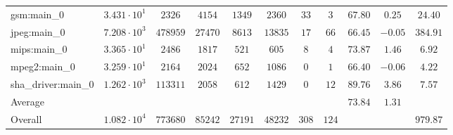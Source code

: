 \begin{tabular}{|l|c|c|c|c|c|c|c|c|c|c|}
gsm:main\_0             & $ 3.431 \cdot 10^{1} $ & $ 2326   $ & $ 4154  $ & $ 1349  $ & $ 2360  $ & $ 33  $ & $ 3   $ & $ 67.80       $ & $ 0.25    $ & $ 24.40   $ \\
jpeg:main\_0            & $ 7.208 \cdot 10^{3} $ & $ 478959 $ & $ 27470 $ & $ 8613  $ & $ 13835 $ & $ 17  $ & $ 66  $ & $ 66.45       $ & $ -0.05   $ & $ 384.91  $ \\
mips:main\_0            & $ 3.365 \cdot 10^{1} $ & $ 2486   $ & $ 1817  $ & $ 521   $ & $ 605   $ & $ 8   $ & $ 4   $ & $ 73.87       $ & $ 1.46    $ & $ 6.92    $ \\
mpeg2:main\_0           & $ 3.259 \cdot 10^{1} $ & $ 2164   $ & $ 2024  $ & $ 652   $ & $ 1086  $ & $ 0   $ & $ 1   $ & $ 66.40       $ & $ -0.06   $ & $ 4.22    $ \\
sha\_driver:main\_0     & $ 1.262 \cdot 10^{3} $ & $ 113311 $ & $ 2058  $ & $ 612   $ & $ 1429  $ & $ 0   $ & $ 12  $ & $ 89.76       $ & $ 3.86    $ & $ 7.57    $ \\
\hline
Average                 & $                    $ & $        $ & $       $ & $       $ & $       $ & $     $ & $     $ & $ 73.84       $ & $ 1.31    $ & $         $ \\
\hline
Overall                 & $ 1.082 \cdot 10^{4} $ & $ 773680 $ & $ 85242 $ & $ 27191 $ & $ 48232 $ & $ 308 $ & $ 124 $ & $             $ & $         $ & $ 979.87  $ \\
\hline
\end{tabular}
